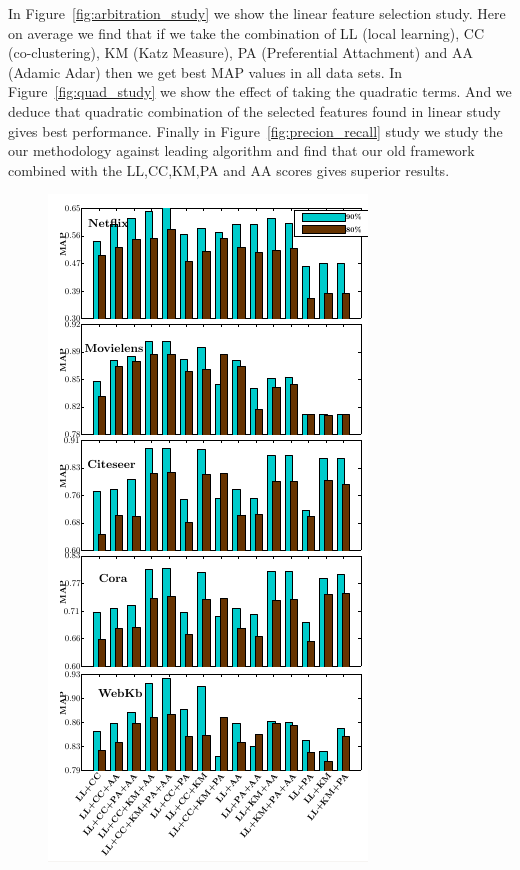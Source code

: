 In Figure~\ref{fig:arbitration_study} we show the linear feature selection study. Here on average we find that if we take the combination of LL (local learning), CC (co-clustering), KM (Katz Measure), PA (Preferential Attachment) and AA (Adamic Adar) then we get best MAP values in all data sets. In Figure~\ref{fig:quad_study} we show the effect of taking the quadratic terms. And we deduce that quadratic combination of the selected features found in linear study gives best performance. Finally in Figure~\ref{fig:precion_recall} study we study the our methodology against leading algorithm and find that our old framework combined with the LL,CC,KM,PA and AA scores gives superior results.
\begin{figure}
\centering
\includegraphics[width=\textwidth,height=\textheight,keepaspectratio]{link_prediction/images/arbitration_study.png}

\end{figure}

